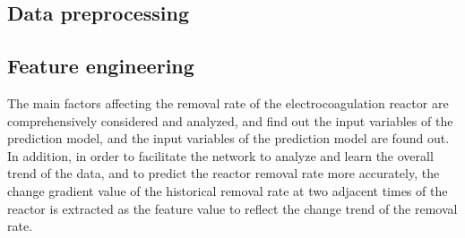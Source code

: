 \subsection{Data preprocessing}

\subsection{Feature engineering}
The main factors affecting the removal rate of the electrocoagulation reactor are comprehensively considered and analyzed, and find out the input variables of the prediction model, and the input variables of the prediction model are found out. In addition, in order to facilitate the network to analyze and learn the overall trend of the data, and to predict the reactor removal rate more accurately, the change gradient value of the historical removal rate at two adjacent times of the reactor is extracted as the feature value to reflect the change trend of the removal rate. \citep{zaghloulDevelopmentEnsembleMachine2021}

